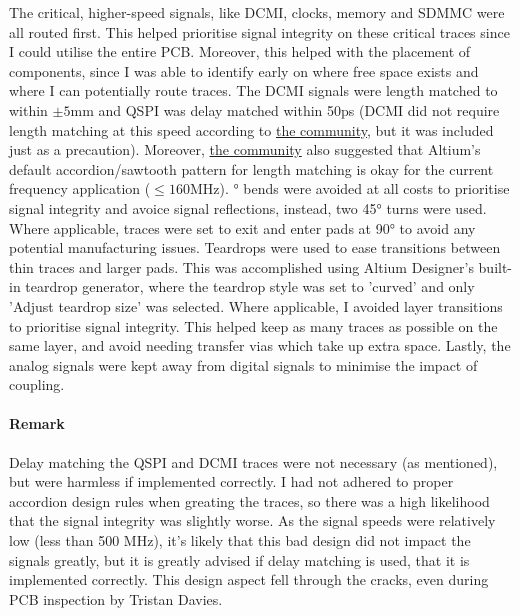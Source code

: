 The critical, higher-speed signals, like DCMI, clocks, memory and SDMMC were all routed first. This helped prioritise signal integrity on these critical traces since I could utilise the entire PCB. Moreover, this helped with the placement of components, since I was able to identify early on where free space exists and where I can potentially route traces. The DCMI signals were length matched to within $\pm5$mm and QSPI was delay matched within 50ps (DCMI did not require length matching at this speed according to \href{https://www.reddit.com/r/AskElectronics/comments/1o9rrs0/is_there_a_required_delaylength_tolerance_for/}{the community}, but it was included just as a precaution). Moreover, \href{https://www.reddit.com/r/PCB/comments/1p12ws5/recommended_length_matching_properties_altium/}{the community} also suggested that Altium's default accordion/sawtooth pattern for length matching is okay for the current frequency application ($\leq160$MHz).
° bends were avoided at all costs to prioritise signal integrity and avoice signal reflections, instead, two 45° turns were used. Where applicable, traces were set to exit and enter pads at 90° to avoid any potential manufacturing issues. Teardrops were used to ease transitions between thin traces and larger pads. This was accomplished using Altium Designer's built-in teardrop generator, where the teardrop style was set to 'curved' and only 'Adjust teardrop size' was selected.
\nl
Where applicable, I avoided layer transitions to prioritise signal integrity. This helped keep as many traces as possible on the same layer, and avoid needing transfer vias which take up extra space. Lastly, the analog signals were kept away from digital signals to minimise the impact of coupling.

\paragraph{Remark}
Delay matching the QSPI and DCMI traces were not necessary (as mentioned), but were harmless if implemented correctly. I had not adhered to proper accordion design rules when greating the traces, so there was a high likelihood that the signal integrity was slightly worse. As the signal speeds were relatively low (less than 500 MHz), it's likely that this bad design did not impact the signals greatly, but it is greatly advised if delay matching is used, that it is implemented correctly. This design aspect fell through the cracks, even during PCB inspection by Tristan Davies.